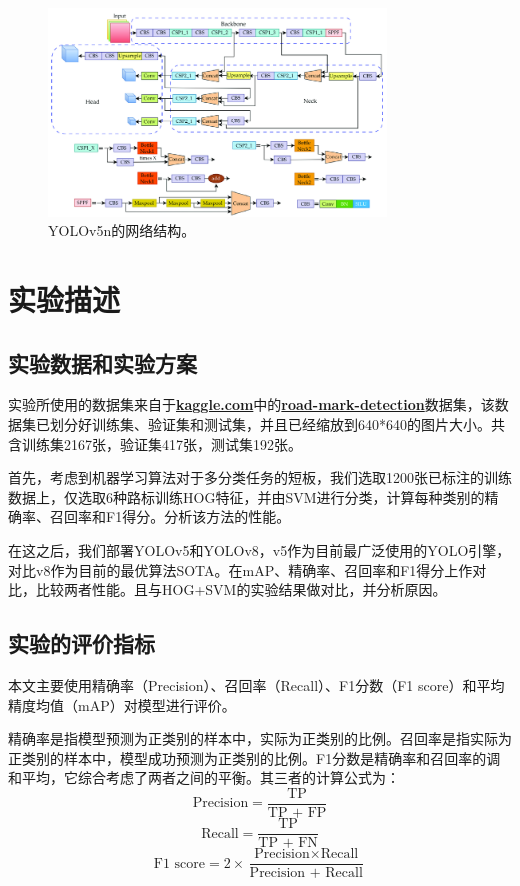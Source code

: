 \documentclass{article}
\begin{document}
\begin{figure}[H]
    \centering
    \includegraphics[width=0.8\textwidth]{YOLOv5n-seg-structure-diagram.png}
    \caption{YOLOv5n的网络结构。}
    \label{fig:1}
\end{figure}

\section{实验描述}
\subsection{实验数据和实验方案}
实验所使用的数据集来自于\href{https://www.kaggle.com/}{\textbf{kaggle.com}}中的\href{https://www.kaggle.com/datasets/pkdarabi/road-mark-detection}{\textbf{road-mark-detection}}数据集，该数据集已划分好训练集、验证集和测试集，并且已经缩放到640*640的图片大小。共含训练集2167张，验证集417张，测试集192张。

首先，考虑到机器学习算法对于多分类任务的短板，我们选取1200张已标注的训练数据上，仅选取6种路标训练HOG特征，并由SVM进行分类，计算每种类别的精确率、召回率和F1得分。分析该方法的性能。

在这之后，我们部署YOLOv5和YOLOv8，v5作为目前最广泛使用的YOLO引擎，对比v8作为目前的最优算法SOTA。在mAP、精确率、召回率和F1得分上作对比，比较两者性能。且与HOG+SVM的实验结果做对比，并分析原因。

\subsection{实验的评价指标}
本文主要使用精确率（Precision）、召回率（Recall）、F1分数（F1 score）和平均精度均值（mAP）对模型进行评价。

精确率是指模型预测为正类别的样本中，实际为正类别的比例。召回率是指实际为正类别的样本中，模型成功预测为正类别的比例。F1分数是精确率和召回率的调和平均，它综合考虑了两者之间的平衡。其三者的计算公式为：
   \[ \text{Precision} = \frac{\text{TP}}{\text{TP + FP}} \]
   \[ \text{Recall} = \frac{\text{TP}}{\text{TP + FN}} \]
   \[ \text{F1 score} = 2 \times \frac{\text{Precision} \times \text{Recall}}{\text{Precision + Recall}} \]
\end{document}
